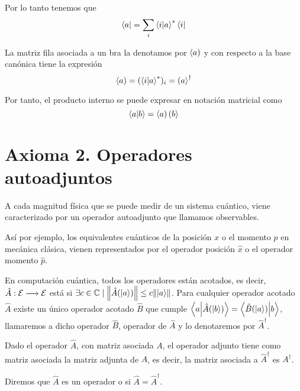 Por lo tanto tenemos que
\begin{equation}
	\label{eq:bra-dirac}
	\bra{a}=\sum_i\braket{i}{a}^*\bra{i}
\end{equation}

La matriz fila asociada a un bra la denotamos por $\left<a\right)$ y con respecto a la base canónica tiene la expresión
\begin{equation}
	\label{eq:bra-matriz}
	\left<a\right)=(\braket{i}{a}^*)_i=\left(a\right>^\dagger
\end{equation}

Por tanto, el producto interno se puede expresar en notación matricial como
\begin{equation}
	\label{eq:producto-interno-matriz}
	\braket{a}{b}=\left<a\right)\left(b\right>
\end{equation}

\section{Axioma 2. Operadores autoadjuntos}\label{sec:axioma-2.-operadores-autoadjuntos}
\begin{definition}[Axioma 2]
	A cada magnitud física que se puede medir de un sistema cuántico, viene caracterizado por un operador autoadjunto que llamamos observables.
\end{definition}
Así por ejemplo, los equivalentes cuánticos de la posición $x$ o el momento $p$ en mecánica clásica, vienen representados por el operador posición $\hat{x}$ o el operador momento $\hat{p}$.

En computación cuántica, todos los operadores están acotados, es decir, $\hat{A}:\mathcal{E}\longrightarrow \mathcal{E}$ está  si  $\exists c\in\mathbb{C}\mid\norm{\hat{A}(\ket{a})}\leq c\norm{\ket{a}}$.
Para cualquier operador acotado $\hat{A}$ existe un único operador acotado $\hat{B}$ que cumple $\braket{a}{\hat{A}(\ket{b})}=\braket{\hat{B}(\ket{a})}{b}$, llamaremos a dicho operador $\hat{B}$, operador  de $\hat{A}$ y lo denotaremos por $\hat{A}^\dagger$.

Dado el operador $\hat{A}$, con matriz asociada $A$, el operador adjunto tiene como matriz asociada la matriz adjunta de $A$, es decir, la matriz asociada a $\hat{A}^\dagger$ es $A^\dagger$.

\begin{definition}
	Diremos que $\hat{A}$ es un operador  o  si $\hat{A}=\hat{A}^\dagger$.
\end{definition}

